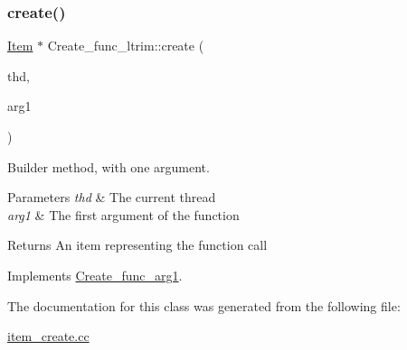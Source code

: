 \subsubsection{\texorpdfstring{create()}{create()}}
{\footnotesize\ttfamily \mbox{\hyperlink{classItem}{Item}} $\ast$ Create\+\_\+func\+\_\+ltrim\+::create (\begin{DoxyParamCaption}\item[{T\+HD $\ast$}]{thd,  }\item[{\mbox{\hyperlink{classItem}{Item}} $\ast$}]{arg1 }\end{DoxyParamCaption})\hspace{0.3cm}{\ttfamily [virtual]}}

Builder method, with one argument. 
\begin{DoxyParams}{Parameters}
{\em thd} & The current thread \\
\hline
{\em arg1} & The first argument of the function \\
\hline
\end{DoxyParams}
\begin{DoxyReturn}{Returns}
An item representing the function call 
\end{DoxyReturn}


Implements \mbox{\hyperlink{classCreate__func__arg1_a3e9a98f755cd82c3e762e334c955a8c9}{Create\+\_\+func\+\_\+arg1}}.



The documentation for this class was generated from the following file\+:\begin{DoxyCompactItemize}
\item 
\mbox{\hyperlink{item__create_8cc}{item\+\_\+create.\+cc}}\end{DoxyCompactItemize}
